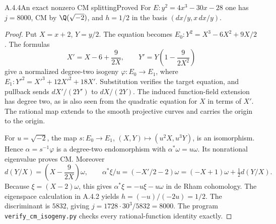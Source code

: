 \begin{result}{A.4.4}{An exact nonzero CM splitting}{Proved}
For $E:y^2=4x^3-30x-28$ one has $j=8000$, CM by $\Q(\sqrt{-2})$, and $h=1/2$ in the basis $(dx/y,x\,dx/y)$.
\end{result}
\begin{proof}
Put $X=x+2$, $Y=y/2$. The equation becomes $E_0:Y^2=X^3-6X^2+9X/2$. The formulas
\[
 X'=X-6+\frac9{2X},\qquad Y'=Y\left(1-\frac9{2X^2}\right)
\]
give a normalized degree-two isogeny $\varphi:E_0\to E_1$, where $E_1:Y'^2=X'^3+12X'^2+18X'$. Substitution verifies the target equation, and pullback sends $dX'/(2Y')$ to $dX/(2Y)$. The induced function-field extension has degree two, as is also seen from the quadratic equation for $X$ in terms of $X'$. The rational map extends to the smooth projective curves and carries the origin to the origin.

For $u=\sqrt{-2}$, the map $s:E_0\to E_1$, $(X,Y)\mapsto(u^2X,u^3Y)$, is an isomorphism. Hence $\alpha=s^{-1}\varphi$ is a degree-two endomorphism with $\alpha^*\omega=u\omega$. Its nonrational eigenvalue proves CM. Moreover
\[
 d(Y/X)=\left(X-\frac9{2X}\right)\omega,
 \qquad \alpha^*\xi/u=(-X'/2-2)\omega
 =(-X+1)\omega+\tfrac12d(Y/X).
\]
Because $\xi=(X-2)\omega$, this gives $\alpha^*\xi=-u\xi-u\omega$ in de Rham cohomology. The eigenspace calculation in A.4.2 yields $h=(-u)/(-2u)=1/2$. The discriminant is $5832$, giving $j=1728\cdot30^3/5832=8000$. The program \texttt{verify\_cm\_isogeny.py} checks every rational-function identity exactly.
\end{proof}

